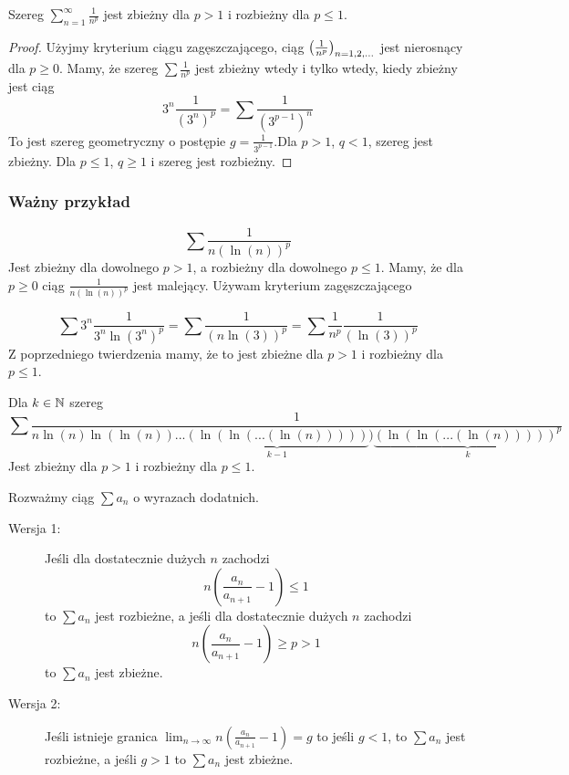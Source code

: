 \documentclass[9pt]{article}
\begin{document}
\begin{Twi}
    Szereg $\sum_{n = 1}^\infty \frac{1}{n^p}$ jest zbieżny dla $p > 1$ i rozbieżny dla $p \le 1$.
\end{Twi}

\begin{proof}
    Użyjmy kryterium ciągu zagęszczającego, ciąg $\left( \frac{1}{n^p}\right)_{n = 1,2,...}$ jest nierosnący dla
    $p \ge 0$. Mamy, że szereg $\sum \frac{1}{n^p}$ jest zbieżny wtedy i tylko wtedy, kiedy zbieżny
    jest ciąg
    \[
        3^n \frac{1}{(3^n)^p} = \sum \frac{1}{(3^{p-1})^n}
    \]
    To jest szereg geometryczny o postępie $g = \frac{1}{3^{p-1}}$.Dla $p > 1$, $q < 1$, szereg jest
    zbieżny. Dla $p \le 1$, $q \ge 1$ i szereg jest rozbieżny.
\end{proof}

\subsubsection*{Ważny przykład}

\[
    \sum \frac{1}{n (\ln(n))^p}
\]
Jest zbieżny dla dowolnego $p > 1$, a rozbieżny dla dowolnego $p \le 1$. Mamy, że dla $p \ge 0$ ciąg
$\frac{1}{n(\ln(n))^p}$ jest malejący. Używam kryterium zagęszczającego

\[
    \sum 3^n \frac{1}{3^n \ln (3^n)^p} =
    \sum \frac{1}{(n\ln(3))^p} =
    \sum \frac{1}{n^p} \frac{1}{(\ln(3))^p}
\]
Z poprzedniego twierdzenia mamy, że to jest zbieżne dla $p > 1$ i rozbieżny dla $p \le 1$.

\begin{Twi}
    Dla $k \in \mathbb{N}$ szereg
    \[
        \sum \frac{1}{n \ln(n) \ln(\ln(n)) ... \underbrace{(\ln(\ln(...(\ln(n)))))}_{k-1})
            \underbrace{(\ln(\ln(...(\ln(n)))))^p}_{k}
        }
    \]
    Jest zbieżny dla $p > 1$ i rozbieżny dla $p \le 1$.
\end{Twi}

\begin{Twi}
    Rozważmy ciąg $\sum a_n$ o wyrazach dodatnich.
    \begin{description}
        \item[Wersja 1:] Jeśli dla dostatecznie dużych $n$ zachodzi
            \[
                n \left(\frac{a_n}{a_{n+1}} - 1\right) \le 1
            \]
            to $\sum a_n$ jest rozbieżne, a jeśli dla dostatecznie dużych $n$ zachodzi
            \[
                n \left(\frac{a_n}{a_{n+1}} - 1\right) \ge p > 1
            \]
            to $\sum a_n$ jest zbieżne.
        \item[Wersja 2:]
            Jeśli istnieje granica
            $\lim_{n \to \infty} n \left(\frac{a_n}{a_{n+1}} - 1\right) = g$
            to jeśli $g < 1$, to $\sum a_n$ jest rozbieżne, a jeśli $g > 1$ to
            $\sum a_n$ jest zbieżne.
    \end{description}
\end{Twi}
\end{document}
